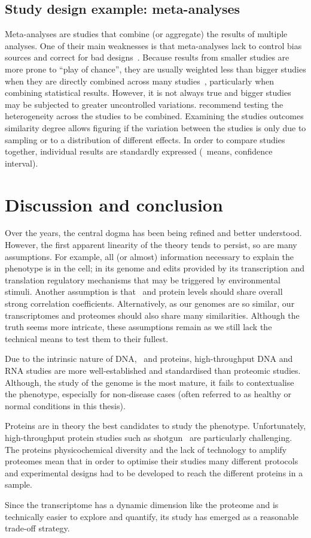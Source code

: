 \subsection{Study design example: meta-analyses}

Meta-analyses are studies that combine (or aggregate) the results of multiple analyses.
One of their main weaknesses is
that meta-analyses lack
to control bias sources and correct for bad designs~.
Because results from smaller studies are more prone to \enquote{play of chance},
they are usually weighted less than bigger studies
when they are directly combined across many studies~,
particularly when combining statistical results.
However, it is not always true and bigger studies may be subjected
to greater uncontrolled variations.
\citet{Egger1997-ny} recommend testing the heterogeneity across the studies
to be combined.
Examining the studies outcomes similarity degree allows figuring
if the variation between the studies is only due to sampling or
to a distribution of different effects.
In order to compare studies together,
individual results are standardly expressed
(\eg\ means, confidence interval).


\section{Discussion and conclusion}

Over the years, the central dogma has been being refined and better understood.
However, the first apparent linearity of the theory tends to persist,
so are many assumptions.
For example,
all (or almost) information necessary to explain the \gls{phenotype} is in the cell;
in its genome and edits provided by
its transcription and translation regulatory mechanisms
that may be triggered by environmental stimuli.
Another assumption is that
\mRNA\ and protein levels should share overall strong correlation coefficients.
Alternatively, as our genomes are so similar,
our transcriptomes and proteomes should also share many similarities.
Although the truth seems more intricate,
these assumptions remain
as we still lack the technical means to test them to their fullest.

Due to the intrinsic nature of \gls{DNA}, \mRNAs\ and proteins,
high-throughput \gls{DNA} and \gls{RNA} studies are more well-established
and standardised than proteomic studies.
Although, the study of the genome is the most mature,
it fails to contextualise the phenotype,
especially for non-disease cases
(often referred to as healthy or normal conditions in this thesis).

Proteins are in theory the best candidates to study the phenotype.
Unfortunately, high-throughput protein studies
such as shotgun \ms\ are particularly challenging.
The proteins physicochemical diversity and
the lack of technology to amplify proteomes mean that
in order to optimise their studies many different protocols and experimental designs
had to be developed to reach the different proteins in a sample.

Since the transcriptome has a dynamic dimension like the proteome
and is technically easier to explore and quantify,
its study has emerged as a reasonable trade-off strategy.


